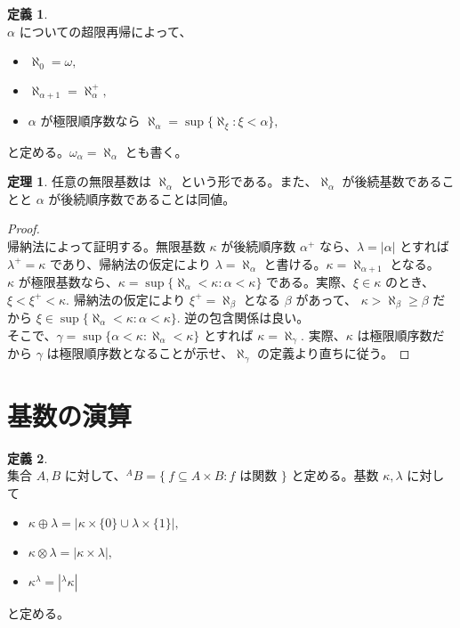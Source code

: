 \documentclass{jsarticle}
\theoremstyle{definition}
\newtheorem*{definition*}{定義}
\newtheorem{theorem}{定理}[section]
\begin{document}
    \begin{definition*} \ \\
        $\alpha$ についての超限再帰によって、
        \begin{itemize}
            \item $\aleph_0 = \omega,$
            \item $\aleph_{\alpha+1} = \aleph_\alpha^+,$
            \item $\alpha$ が極限順序数なら $\aleph_\alpha = \sup \{\aleph_\xi : \xi < \alpha\},$
        \end{itemize}
        と定める。$\omega_\alpha = \aleph_\alpha$ とも書く。
    \end{definition*}
    
    \begin{theorem}
        任意の無限基数は $\aleph_\alpha$ という形である。また、$\aleph_\alpha$ が後続基数であることと $\alpha$ が後続順序数であることは同値。
    \end{theorem}
    \begin{proof} \ \\
        帰納法によって証明する。無限基数 $\kappa$ が後続順序数 $\alpha^+$ なら、$\lambda = |\alpha|$ とすれば $\lambda^+ = \kappa$ であり、帰納法の仮定により $\lambda = \aleph_\alpha$ と書ける。$\kappa = \aleph_{\alpha+1}$ となる。\\
        $\kappa$ が極限基数なら、$\kappa = \sup \{\aleph_\alpha < \kappa : \alpha < \kappa\}$ である。実際、$\xi \in \kappa$ のとき、$\xi < \xi^+ < \kappa.$ 帰納法の仮定により $\xi^+ = \aleph_\beta$ となる $\beta$ があって、 $\kappa > \aleph_\beta \geq \beta$ だから $\xi \in \sup \{\aleph_\alpha < \kappa : \alpha < \kappa\}.$ 逆の包含関係は良い。\\
        そこで、$\gamma = \sup \{\alpha < \kappa : \aleph_\alpha < \kappa\}$ とすれば $\kappa = \aleph_\gamma.$ 実際、$\kappa$ は極限順序数だから $\gamma$ は極限順序数となることが示せ、$\aleph_\gamma$ の定義より直ちに従う。
    \end{proof}
    \newpage
    
    \section{基数の演算}
    \begin{definition*} \ \\
        集合 $A, B$ に対して、$^AB = \{\ f \subseteq A \times B : f$ は関数 $ \}$ と定める。基数 $\kappa, \lambda$ に対して
        \begin{itemize}
            \item $\kappa \oplus \lambda = |\kappa \times \{0\} \cup \lambda \times \{1\}|,$
            \item $\kappa \otimes \lambda = |\kappa \times \lambda|,$
            \item $\kappa^\lambda = |^\lambda\kappa|$
        \end{itemize}
        と定める。
    \end{definition*}
    
\end{document}
